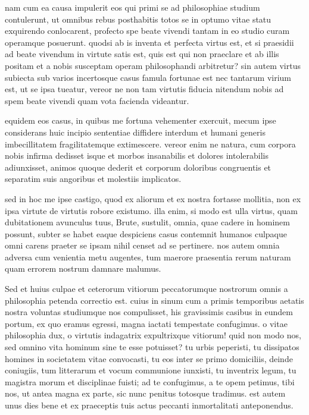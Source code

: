  nam cum ea causa impulerit eos qui primi se ad philosophiae studium contulerunt, ut omnibus rebus posthabitis totos se in optumo vitae statu exquirendo conlocarent, profecto spe beate vivendi tantam in eo studio curam operamque posuerunt. quodsi ab is inventa et perfecta virtus est, et si praesidii ad beate vivendum in virtute satis est, quis est qui non praeclare et ab illis positam et a nobis susceptam operam philosophandi arbitretur? sin autem virtus subiecta sub varios incertosque casus famula fortunae est nec tantarum virium est, ut se ipsa tueatur, vereor ne non tam virtutis fiducia nitendum nobis ad spem beate vivendi quam vota facienda videantur.

 equidem eos casus, in quibus me fortuna vehementer exercuit, mecum ipse considerans huic incipio sententiae diffidere interdum et humani generis imbecillitatem fragilitatemque extimescere. vereor enim ne natura, cum corpora nobis infirma dedisset isque et morbos insanabilis et dolores intolerabilis adiunxisset, animos quoque dederit et corporum doloribus congruentis et separatim suis angoribus et molestiis implicatos.

 sed in hoc me ipse castigo, quod ex aliorum et ex nostra fortasse mollitia, non ex ipsa virtute de virtutis robore existumo. illa enim, si modo est ulla virtus, quam dubitationem avunculus tuus, Brute, sustulit, omnia, quae cadere in hominem possunt, subter se habet eaque despiciens casus contemnit humanos culpaque omni carens praeter se ipsam nihil censet ad se pertinere. nos autem omnia adversa cum venientia metu augentes, tum maerore praesentia rerum naturam quam errorem nostrum damnare malumus.

 Sed et huius culpae et ceterorum vitiorum peccatorumque nostrorum omnis a philosophia petenda correctio est. cuius in sinum cum a primis temporibus aetatis nostra voluntas studiumque nos compulisset, his gravissimis casibus in eundem portum, ex quo eramus egressi, magna iactati tempestate confugimus. o vitae philosophia dux, o virtutis indagatrix expultrixque vitiorum! quid non modo nos, sed omnino vita hominum sine te esse potuisset? tu urbis peperisti, tu dissipatos homines in societatem vitae convocasti, tu eos inter se primo domiciliis, deinde coniugiis, tum litterarum et vocum communione iunxisti, tu inventrix legum, tu magistra morum et disciplinae fuisti; ad te confugimus, a te opem petimus, tibi nos, ut antea magna ex parte, sic nunc penitus totosque tradimus. est autem unus dies bene et ex praeceptis tuis actus peccanti inmortalitati anteponendus.

